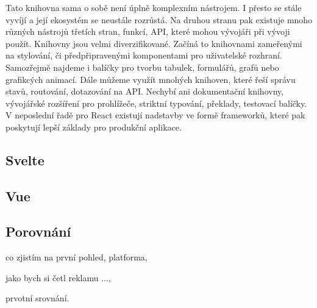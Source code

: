 Tato knihovna sama o sobě není úplně komplexním nástrojem. I přesto se stále vyvíjí a její ekosystém se neustále rozrůstá. 
Na druhou stranu pak existuje mnoho různých nástrojů třetích stran, funkcí, API, které mohou vývojáři při vývoji použít.
Knihovny jsou velmi diverzifikované. Začíná to knihovnami zameřenými na stylování, či předpřipravenými komponentami pro uživatelské rozhraní. 
Samozřejmě najdeme i balíčky pro tvorbu tabulek, formulářů, grafů nebo grafikcých animací.
Dále můžeme využít mnohých knihoven, které řeší správu stavů, routování, dotazování na API. 
Nechybí ani dokumentační knihovny, vývojářské rozšíření pro prohlížeče, striktní typování, překlady, testovací balíčky. 
V neposlední řadě pro React existují nadstavby ve formě frameworků, které pak poskytují lepší základy pro produkční aplikace.\cite{awesomereact,builderreacteco,react}

\subsection{Svelte}

\subsection{Vue}

\subsection{Porovnání}

\begin{citemize}
	\item co zjistím na první pohled, platforma,
	\item jako bych si četl reklamu ...,
	\item prvotní srovnání.
\end{citemize}

